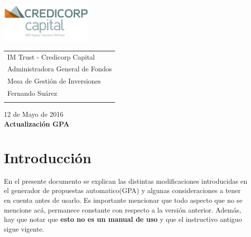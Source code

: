\documentclass{article}
\begin{document}
\includegraphics[width=4.6cm]{logor.png}
\vspace*{-1.9cm}

\hspace*{1.4 cm}
 \hspace*{2.9 cm}
 \begin{tabular}{l}
  \sc IM Trust - Credicorp Capital\\
  \sc Administradora General de Fondos \\
  \sc Mesa de Gestión de Inversiones  \\
  \sc Fernando Suárez  \\
  \vspace{15\baselineskip}\mbox{}
  \vspace{-3mm}\mbox{}
 \end{tabular}


 \bigskip

\vspace*{5mm}
\begin{center}
{12 de Mayo de 2016} \\
\vspace{3mm}
{\Large\bf Actualización GPA} \\
\vspace{2mm}
\end{center}
\section{Introducción}

En el presente documento se explican las distintas modificaciones introducidas en el generador de propuestas automatico(GPA) y algunas consideraciones a tener en cuenta antes de usarlo. Es importante mencionar que todo aspecto que no se mencione acá, permanece constante con respecto a la versión anterior. Además, hay que notar que \textbf{esto no es un manual de uso} y que el instructivo antiguo sigue vigente.
\end{document}
